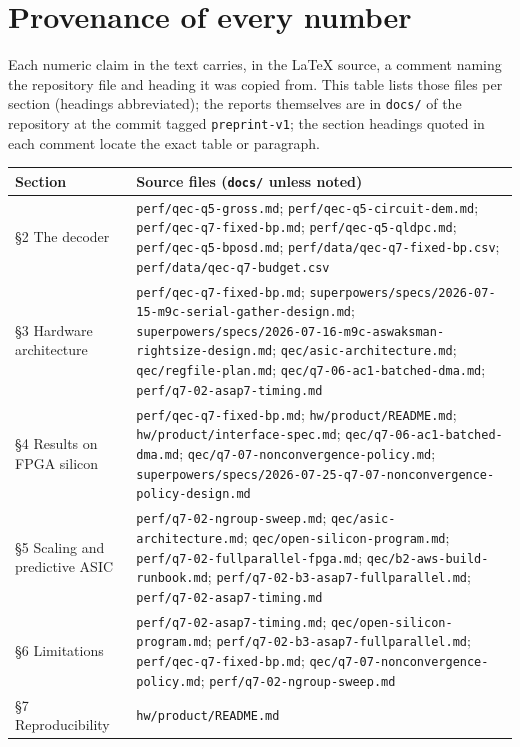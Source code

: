 \section{Provenance of every number}
\label{app:prov}

Each numeric claim in the text carries, in the \LaTeX{} source, a comment naming the repository
file and heading it was copied from. This table lists those files per section (headings
abbreviated); the reports themselves are in \texttt{docs/} of the repository \citep{alephrepo}
at the commit tagged \texttt{preprint-v1}; the section headings quoted in each comment locate the
exact table or paragraph.

\begin{footnotesize}
\begin{tabular}{@{}p{}>{\raggedright\arraybackslash}p{}@{}}
\toprule
Section & Source files (\texttt{docs/} unless noted) \\
\midrule
\S2 The decoder & \texttt{perf/qec-q5-gross.md}; \texttt{perf/qec-q5-circuit-dem.md}; \texttt{perf/qec-q7-fixed-bp.md}; \texttt{perf/qec-q5-qldpc.md}; \texttt{perf/qec-q5-bposd.md}; \texttt{perf/data/qec-q7-fixed-bp.csv}; \texttt{perf/data/qec-q7-budget.csv} \\[2pt]
\S3 Hardware architecture & \texttt{perf/qec-q7-fixed-bp.md}; \texttt{superpowers/specs/2026-07-15-m9c-serial-gather-design.md}; \texttt{superpowers/specs/2026-07-16-m9c-aswaksman-rightsize-design.md}; \texttt{qec/asic-architecture.md}; \texttt{qec/regfile-plan.md}; \texttt{qec/q7-06-ac1-batched-dma.md}; \texttt{perf/q7-02-asap7-timing.md} \\[2pt]
\S4 Results on FPGA silicon & \texttt{perf/qec-q7-fixed-bp.md}; \texttt{hw/product/README.md}; \texttt{hw/product/interface-spec.md}; \texttt{qec/q7-06-ac1-batched-dma.md}; \texttt{qec/q7-07-nonconvergence-policy.md}; \texttt{superpowers/specs/2026-07-25-q7-07-nonconvergence-policy-design.md} \\[2pt]
\S5 Scaling and predictive ASIC & \texttt{perf/q7-02-ngroup-sweep.md}; \texttt{qec/asic-architecture.md}; \texttt{qec/open-silicon-program.md}; \texttt{perf/q7-02-fullparallel-fpga.md}; \texttt{qec/b2-aws-build-runbook.md}; \texttt{perf/q7-02-b3-asap7-fullparallel.md}; \texttt{perf/q7-02-asap7-timing.md} \\[2pt]
\S6 Limitations & \texttt{perf/q7-02-asap7-timing.md}; \texttt{qec/open-silicon-program.md}; \texttt{perf/q7-02-b3-asap7-fullparallel.md}; \texttt{perf/qec-q7-fixed-bp.md}; \texttt{qec/q7-07-nonconvergence-policy.md}; \texttt{perf/q7-02-ngroup-sweep.md} \\[2pt]
\S7 Reproducibility & \texttt{hw/product/README.md} \\[2pt]
\bottomrule
\end{tabular}
\end{footnotesize}
